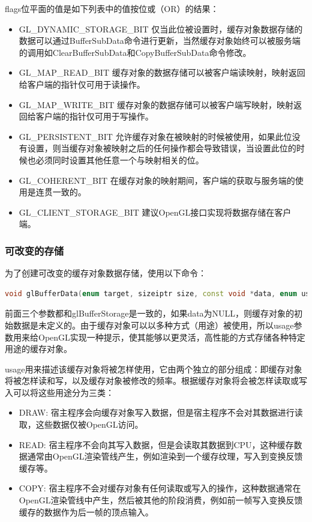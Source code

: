 flags位平面的值是如下列表中的值按位或（OR）的结果：

\begin{itemize}
	\item GL\_DYNAMIC\_STORAGE\_BIT 仅当此位被设置时，缓存对象数据存储的数据可以通过BufferSubData命令进行更新，当然缓存对象始终可以被服务端的调用如ClearBufferSubData和CopyBufferSubData命令修改。
	\item GL\_MAP\_READ\_BIT 缓存对象的数据存储可以被客户端读映射，映射返回给客户端的指针仅可用于读操作。
	\item GL\_MAP\_WRITE\_BIT 缓存对象的数据存储可以被客户端写映射，映射返回给客户端的指针仅可用于写操作。 
	\item GL\_PERSISTENT\_BIT 允许缓存对象在被映射的时候被使用，如果此位没有设置，则当缓存对象被映射之后的任何操作都会导致错误，当设置此位的时候也必须同时设置其他任意一个与映射相关的位。 
	\item GL\_COHERENT\_BIT 在缓存对象的映射期间，客户端的获取与服务端的使用是连贯一致的。
	\item GL\_CLIENT\_STORAGE\_BIT 建议OpenGL接口实现将数据存储在客户端。
\end{itemize}




\subsubsection{可改变的存储}
为了创建可改变的缓存对象数据存储，使用以下命令：

\begin{lstlisting}[language=C++]
void glBufferData​(enum target, sizeiptr size, const void *data, enum usage);
\end{lstlisting}

前面三个参数都和glBufferStorage是一致的，如果data为NULL，则缓存对象的初始数据是未定义的。由于缓存对象可以以多种方式（用途）被使用，所以usage参数用来给OpenGL实现一种提示，使其能够以更灵活，高性能的方式存储各种特定用途的缓存对象。

usage用来描述该缓存对象将被怎样使用，它由两个独立的部分组成：即缓存对象将被怎样读和写，以及缓存对象被修改的频率。根据缓存对象将会被怎样读取或写入可以将这些用途分为三类：

\begin{itemize}
	\item DRAW: 宿主程序会向缓存对象写入数据，但是宿主程序不会对其数据进行读取，这些数据仅被OpenGL访问。
	\item READ: 宿主程序不会向其写入数据，但是会读取其数据到CPU，这种缓存数据通常由OpenGL渲染管线产生，例如渲染到一个缓存纹理，写入到变换反馈缓存等。
	\item COPY: 宿主程序不会对缓存对象有任何读取或写入的操作，这种数据通常在OpenGL渲染管线中产生，然后被其他的阶段消费，例如前一帧写入变换反馈缓存的数据作为后一帧的顶点输入。
\end{itemize}

